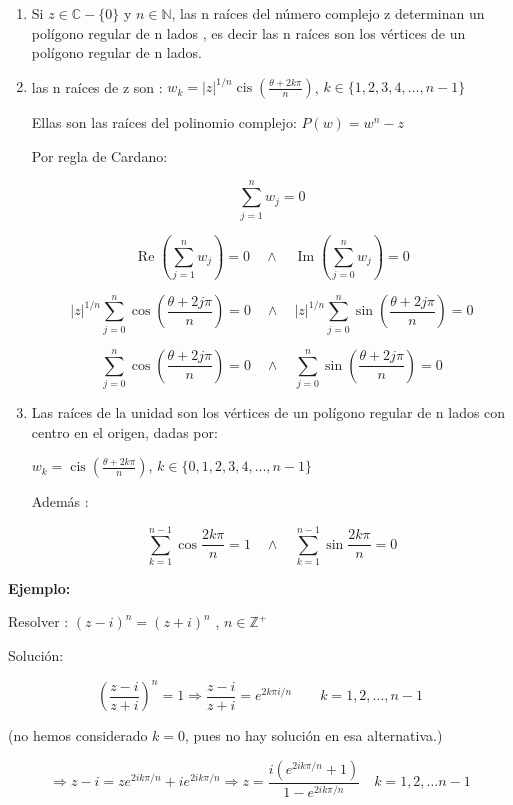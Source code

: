 \documentclass[a4paper,12pt]{article}
\begin{document}
\begin{enumerate}
    \item Si $z \in \mathbb{C} - \{0\}$ y $n \in \mathbb{N}$, las n raíces del número complejo z determinan un polígono regular de n lados , es decir las n raíces son los vértices de un polígono regular de n lados.
    
    \item las n raíces de z son : $w_k = |z|^{1/n} \operatorname{cis}\left(\frac{\theta + 2k\pi}{n}\right)$, $k \in \{1,2,3,4,\ldots,n-1\}$
    
    Ellas son las raíces del polinomio complejo: $P(w) = w^n-z$
    
    Por regla de Cardano:
    
    \[\sum_{j=1}^n w_j = 0\]
    
    \[\operatorname{Re}\left(\sum_{j=1}^n w_j\right) = 0 \quad \wedge \quad \operatorname{Im}\left(\sum_{j=0}^n w_j\right) = 0\]
    
    \[|z|^{1/n} \sum_{j=0}^n \cos\left(\frac{\theta + 2j\pi}{n}\right) = 0 \quad \wedge \quad |z|^{1/n} \sum_{j=0}^n \sin\left(\frac{\theta + 2j\pi}{n}\right) = 0\]
    
    \[\sum_{j=0}^n \cos\left(\frac{\theta + 2j\pi}{n}\right) = 0 \quad \wedge \quad \sum_{j=0}^n \sin\left(\frac{\theta + 2j\pi}{n}\right) = 0\]
    
    \item Las raíces de la unidad son los vértices de un polígono regular de n lados con centro en el origen, dadas por:
    
    $w_k = \operatorname{cis}\left(\frac{\theta + 2k\pi}{n}\right)$, $k \in \{0,1,2,3,4,\ldots,n-1\}$
    
    Además :
    
    \[\sum_{k=1}^{n-1} \cos\frac{2k\pi}{n} = 1 \quad \wedge \quad \sum_{k=1}^{n-1} \sin\frac{2k\pi}{n} = 0\]
\end{enumerate}


\textbf{Ejemplo:}

Resolver : $(z-i)^n = (z+i)^n$ , $n \in \mathbb{Z}^+$

Solución:

\[
\left(\frac{z-i}{z+i}\right)^n = 1 \Rightarrow \frac{z-i}{z+i} = e^{2k\pi i/n} \qquad k = 1,2, \ldots , n-1
\]


(no hemos considerado $k = 0$, pues no hay solución en esa alternativa.)

\[\Rightarrow z-i = z e^{2ik\pi/n} + i e^{2ik\pi/n} \Rightarrow z = \frac{i(e^{2ik\pi/n} + 1)}{1 - e^{2ik\pi/n}} \quad k = 1,2, \ldots n-1\]
\end{document}
